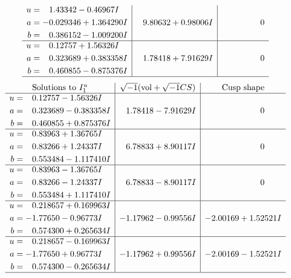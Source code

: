 \documentclass[1p]{elsarticle_modified}
\theoremstyle{definition}
\newcommand{\I}{\sqrt{-1}}
\begin{document}
$$\begin{array}{c|c|c}
\begin{aligned}
u &= \phantom{-}1.43342 - 0.46967 I \\
a &= -0.029346 + 1.364290 I \\
b &= \phantom{-}0.386152 - 1.009200 I\end{aligned}
 & \phantom{-}9.80632 + 0.98006 I & \phantom{-0.000000 } 0 \\ \hline\begin{aligned}
u &= \phantom{-}0.12757 + 1.56326 I \\
a &= \phantom{-}0.323689 + 0.383358 I \\
b &= \phantom{-}0.460855 - 0.875376 I\end{aligned}
 & \phantom{-}1.78418 + 7.91629 I & \phantom{-0.000000 } 0\\
 \hline 
 \end{array}$$\newpage$$\begin{array}{c|c|c}  
\text{Solutions to }I^u_{1}& \I (\text{vol} + \sqrt{-1}CS) & \text{Cusp shape}\\
 \hline 
\begin{aligned}
u &= \phantom{-}0.12757 - 1.56326 I \\
a &= \phantom{-}0.323689 - 0.383358 I \\
b &= \phantom{-}0.460855 + 0.875376 I\end{aligned}
 & \phantom{-}1.78418 - 7.91629 I & \phantom{-0.000000 } 0 \\ \hline\begin{aligned}
u &= \phantom{-}0.83963 + 1.36765 I \\
a &= \phantom{-}0.83266 + 1.24337 I \\
b &= \phantom{-}0.553484 - 1.117410 I\end{aligned}
 & \phantom{-}6.78833 + 8.90117 I & \phantom{-0.000000 } 0 \\ \hline\begin{aligned}
u &= \phantom{-}0.83963 - 1.36765 I \\
a &= \phantom{-}0.83266 - 1.24337 I \\
b &= \phantom{-}0.553484 + 1.117410 I\end{aligned}
 & \phantom{-}6.78833 - 8.90117 I & \phantom{-0.000000 } 0 \\ \hline\begin{aligned}
u &= \phantom{-}0.218657 + 0.169963 I \\
a &= -1.77650 - 0.96773 I \\
b &= \phantom{-}0.574300 + 0.265634 I\end{aligned}
 & -1.17962 - 0.99556 I & -2.00169 + 1.52521 I \\ \hline\begin{aligned}
u &= \phantom{-}0.218657 - 0.169963 I \\
a &= -1.77650 + 0.96773 I \\
b &= \phantom{-}0.574300 - 0.265634 I\end{aligned}
 & -1.17962 + 0.99556 I & -2.00169 - 1.52521 I\\
 \hline 
 \end{array}$$\newpage\newpage\renewcommand{\arraystretch}{1}
\end{document}
